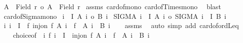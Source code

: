 \begin{isabellebody}
\ {\isachardoublequoteopen}{\isacharbar}{\kern0pt}A\ {\isasymtimes}\ {\isacharparenleft}{\kern0pt}Field\ r{\isacharparenright}{\kern0pt}{\isacharbar}{\kern0pt}\ {\isasymle}o\ {\isacharbar}{\kern0pt}A\ {\isasymtimes}\ {\isacharparenleft}{\kern0pt}Field\ r{\isacharprime}{\kern0pt}{\isacharparenright}{\kern0pt}{\isacharbar}{\kern0pt}{\isachardoublequoteclose}\isanewline
%
\isadelimproof
%
\endisadelimproof
%
\isatagproof
{}\isamarkupfalse%
\ assms\ card{\isacharunderscore}{\kern0pt}of{\isacharunderscore}{\kern0pt}mono{}\ card{\isacharunderscore}{\kern0pt}of{\isacharunderscore}{\kern0pt}Times{\isacharunderscore}{\kern0pt}mono{}\ \isamarkupfalse%
\ blast%
\endisatagproof
{\isafoldproof}%
%
\isadelimproof
\isanewline
%
\endisadelimproof
\isanewline
{}\isamarkupfalse%
\ card{\isacharunderscore}{\kern0pt}of{\isacharunderscore}{\kern0pt}Sigma{\isacharunderscore}{\kern0pt}mono{}{\isacharcolon}{\kern0pt}\isanewline
{}\ {\isachardoublequoteopen}{\isasymforall}i\ {\isasymin}\ I{\isachardot}{\kern0pt}\ {\isacharbar}{\kern0pt}A\ i{\isacharbar}{\kern0pt}\ {\isasymle}o\ {\isacharbar}{\kern0pt}B\ i{\isacharbar}{\kern0pt}{\isachardoublequoteclose}\isanewline
{}\ {\isachardoublequoteopen}{\isacharbar}{\kern0pt}SIGMA\ i\ {\isacharcolon}{\kern0pt}\ I{\isachardot}{\kern0pt}\ A\ i{\isacharbar}{\kern0pt}\ {\isasymle}o\ {\isacharbar}{\kern0pt}SIGMA\ i\ {\isacharcolon}{\kern0pt}\ I{\isachardot}{\kern0pt}\ B\ i{\isacharbar}{\kern0pt}{\isachardoublequoteclose}\isanewline
%
\isadelimproof
%
\endisadelimproof
%
\isatagproof
{}\isamarkupfalse%
{\isacharminus}{\kern0pt}\isanewline
\ \ \isamarkupfalse%
\ {\isachardoublequoteopen}{\isasymforall}i{\isachardot}{\kern0pt}\ i\ {\isasymin}\ I\ {\isasymlongrightarrow}\ {\isacharparenleft}{\kern0pt}{\isasymexists}f{\isachardot}{\kern0pt}\ inj{\isacharunderscore}{\kern0pt}on\ f\ {\isacharparenleft}{\kern0pt}A\ i{\isacharparenright}{\kern0pt}\ {\isasymand}\ f\ {\isacharbackquote}{\kern0pt}\ {\isacharparenleft}{\kern0pt}A\ i{\isacharparenright}{\kern0pt}\ {\isasymle}\ B\ i{\isacharparenright}{\kern0pt}{\isachardoublequoteclose}\isanewline
\ \ \isamarkupfalse%
\ assms\ \isamarkupfalse%
\ {\isacharparenleft}{\kern0pt}auto\ simp\ add{\isacharcolon}{\kern0pt}\ card{\isacharunderscore}{\kern0pt}of{\isacharunderscore}{\kern0pt}ordLeq{\isacharparenright}{\kern0pt}\isanewline
\ \ \isamarkupfalse%
\ choice{\isacharbrackleft}{\kern0pt}of\ {\isachardoublequoteopen}{\isasymlambda}\ i\ f{\isachardot}{\kern0pt}\ i\ {\isasymin}\ I\ {\isasymlongrightarrow}\ inj{\isacharunderscore}{\kern0pt}on\ f\ {\isacharparenleft}{\kern0pt}A\ i{\isacharparenright}{\kern0pt}\ {\isasymand}\ f\ {\isacharbackquote}{\kern0pt}\ {\isacharparenleft}{\kern0pt}A\ i{\isacharparenright}{\kern0pt}\ {\isasymle}\ B\ i{\isachardoublequoteclose}{\isacharbrackright}{\kern0pt}\isanewline

\end{isabellebody}

